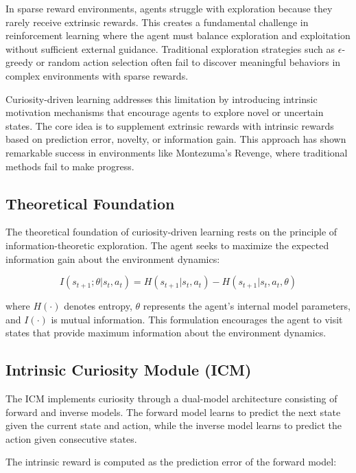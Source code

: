 \documentclass[12pt]{article}
\begin{document}
{{{In sparse reward environments, agents struggle with exploration because they rarely receive extrinsic rewards. This creates a fundamental challenge in reinforcement learning where the agent must balance exploration and exploitation without sufficient external guidance. Traditional exploration strategies such as $\epsilon$-greedy or random action selection often fail to discover meaningful behaviors in complex environments with sparse rewards.

Curiosity-driven learning addresses this limitation by introducing intrinsic motivation mechanisms that encourage agents to explore novel or uncertain states. The core idea is to supplement extrinsic rewards with intrinsic rewards based on prediction error, novelty, or information gain. This approach has shown remarkable success in environments like Montezuma's Revenge, where traditional methods fail to make progress.

\subsection{Theoretical Foundation}

The theoretical foundation of curiosity-driven learning rests on the principle of information-theoretic exploration. The agent seeks to maximize the expected information gain about the environment dynamics:

\begin{equation}
I(s_{t+1}; \theta | s_t, a_t) = H(s_{t+1} | s_t, a_t) - H(s_{t+1} | s_t, a_t, \theta)
\end{equation}

where $H(\cdot)$ denotes entropy, $\theta$ represents the agent's internal model parameters, and $I(\cdot)$ is mutual information. This formulation encourages the agent to visit states that provide maximum information about the environment dynamics.

\subsection{Intrinsic Curiosity Module (ICM)}

The ICM implements curiosity through a dual-model architecture consisting of forward and inverse models. The forward model learns to predict the next state given the current state and action, while the inverse model learns to predict the action given consecutive states.

The intrinsic reward is computed as the prediction error of the forward model:

}}}
\end{document}
